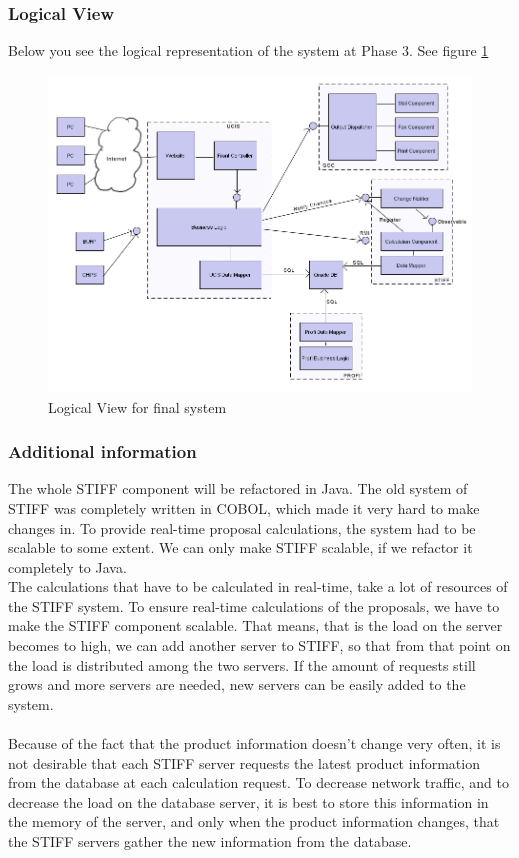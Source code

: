 \subsubsection{Logical View}
Below you see the logical representation of the system at Phase 3. See figure \ref{fig:logical_final}
\begin{figure}[ht]
	\centering
		\includegraphics[width=1.00\textwidth]{img/logical-final.png}
	\caption{Logical View for final system}
	\label{fig:logical_final}
\end{figure}


\subsubsection{Additional information}
The whole STIFF component will be refactored in Java. The old system of STIFF was
completely written in COBOL, which made it very hard to make changes in. To provide 
real-time proposal calculations, the system had to be scalable to some extent. We can 
only make STIFF scalable, if we refactor it completely to Java.\\
The calculations that have to be calculated in real-time, take a lot of resources of the 
STIFF system. To ensure real-time calculations of the proposals, we have to make the STIFF 
component scalable. That means, that is the load on the server becomes to high, we can add 
another server to STIFF, so that from that point on the load is distributed among the two 
servers. If the amount of requests still grows and more servers are needed, new servers 
can be easily added to the system.\\
 \\
Because of the fact that the product information doesn't change very often, it is not
desirable that each STIFF server requests the latest product information from the database at
each calculation request. To decrease network traffic, and to decrease the load on the 
database server, it is best to store this information in the memory of the server,
and only when the product information changes, that the STIFF servers gather the new 
information from the database.
